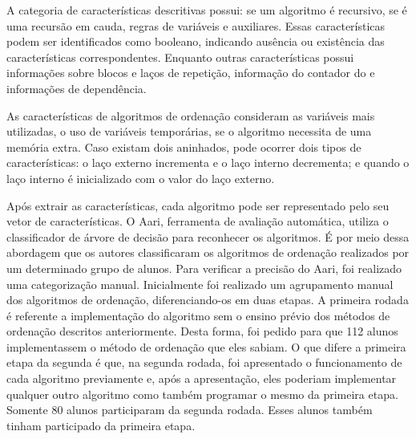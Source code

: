 	    A categoria de características descritivas possui: se um algoritmo é
	    recursivo, se é uma recursão em cauda, regras de variáveis e 
	    auxiliares. Essas características podem ser identificados como booleano,
	    indicando ausência ou existência das características correspondentes. Enquanto
	    outras características possui informações sobre blocos e laços de repetição,
	    informação do contador do  e informações de dependência.
	    
	    As características de algoritmos de ordenação consideram as variáveis mais
	    utilizadas, o uso de variáveis temporárias, se o algoritmo necessita de uma
	    memória extra. Caso existam dois  aninhados, pode ocorrer
	    dois tipos de características: o laço externo incrementa e o laço interno
	    decrementa; e quando o laço interno é inicializado com o valor do laço externo. 
	    
	    Após extrair as características, cada algoritmo pode ser representado pelo seu
	    vetor de características. O Aari, ferramenta de avaliação automática, utiliza
		o classificador de árvore de decisão para reconhecer os algoritmos. É por meio
		dessa abordagem que os autores classificaram os algoritmos de ordenação
		realizados por um determinado grupo de alunos. Para verificar a precisão do
		Aari, foi realizado uma categorização manual. Inicialmente foi realizado um
		agrupamento manual dos algoritmos de ordenação, diferenciando-os em duas
		etapas. A primeira rodada é referente a implementação do algoritmo sem o
		ensino prévio dos métodos de ordenação descritos anteriormente. Desta
		forma, foi pedido para que 112 alunos implementassem o método de ordenação
		que eles sabiam. O que difere a primeira etapa da segunda é que, na segunda
		rodada, foi apresentado o funcionamento de cada algoritmo previamente e,
		após a apresentação, eles poderiam implementar qualquer outro algoritmo
		como também programar o mesmo da primeira etapa. Somente 80 alunos participaram
		da segunda rodada. Esses alunos também tinham participado da primeira etapa. 
		
